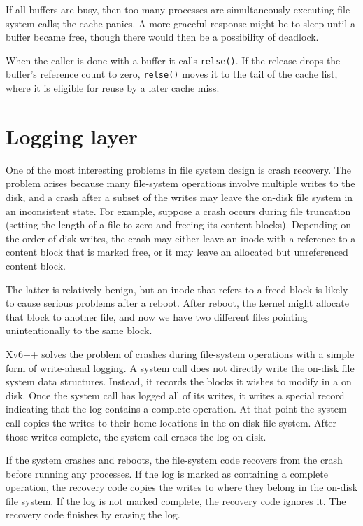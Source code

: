If all buffers are busy, then too many processes are simultaneously executing
file system calls; the cache panics. A more graceful response might be to sleep
until a buffer became free, though there would then be a possibility of deadlock.

When the caller is done with a buffer it calls \lstinline{relse()}.
If the release drops the buffer's reference count to zero,
\lstinline{relse()} moves it to the tail of the cache list, where it is eligible
for reuse by a later cache miss.

\section{Logging layer}

One of the most interesting problems in file system design is crash recovery.
The problem arises because many file-system operations involve multiple writes
to the disk, and a crash after a subset of the writes may leave the on-disk file
system in an inconsistent state. For example, suppose a crash occurs during file
truncation (setting the length of a file to zero and freeing its content blocks).
Depending on the order of disk writes, the crash may either leave an inode with a
reference to a content block that is marked free, or it may leave an allocated but
unreferenced content block.

The latter is relatively benign, but an inode that refers to a freed block is
likely to cause serious problems after a reboot. After reboot, the kernel might
allocate that block to another file, and now we have two different files pointing
unintentionally to the same block.

Xv6++ solves the problem of crashes during file-system operations with a simple
form of write-ahead logging. A system call does not directly write the on-disk file
system data structures. Instead, it records the blocks it wishes to modify in a
 on disk. Once the system call has logged all of its writes, it
writes a special  record indicating that the log contains a
complete operation. At that point the system call copies the writes to their home
locations in the on-disk file system. After those writes complete, the system call
erases the log on disk.

If the system crashes and reboots, the file-system code recovers from the crash
before running any processes. If the log is marked as containing a complete
operation, the recovery code copies the writes to where they belong in the on-disk
file system. If the log is not marked complete, the recovery code ignores it. The
recovery code finishes by erasing the log.

